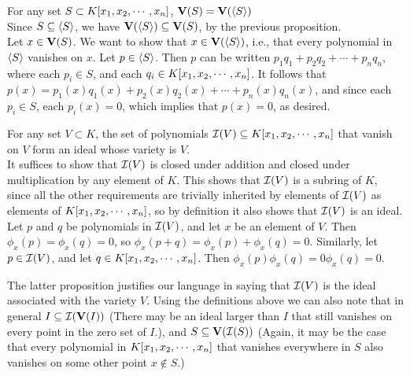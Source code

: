 \documentclass[twoside]{report}
\begin{document}
\begin{proposition} For any set $S \subset K[x_1, x_2,\cdots,x_n]$, $\mathbf{V}(S) = \mathbf{V}(\langle S\rangle)$\\

  Since $S \subseteq \langle S\rangle$, we have $\mathbf{V}(\langle S\rangle)
  \subseteq \mathbf{V}(S)$, by the previous proposition.\\

  Let $x \in \mathbf{V}(S)$. We want to show that $x \in
  \mathbf{V}(\langle S\rangle)$, i.e., that every polynomial in $\langle S\rangle$
  vanishes on $x$.  Let $p \in \langle S\rangle$.  Then $p$ can be written
  $p_1q_1 + p_2q_2 + \cdots + p_nq_n$, where each $p_i \in S$, and
  each $q_i \in K[x_1, x_2,\cdots,x_n]$.  It follows that $p(x) = p_1(x)q_1(x) +
  p_2(x)q_2(x) + \cdots + p_n(x)q_n(x)$, and since each $p_i \in S$,
  each $p_i(x) = 0$, which implies that $p(x) = 0$, as desired.

\end{proposition}

\begin{proposition} For any set $V \subset K$, the set of polynomials
  $\mathcal{I}(V) \subseteq K[x_1, x_2,\cdots,x_n]$ that vanish on $V$ form an ideal
  whose variety is $V$.\\

  It suffices to show that $\mathcal{I}(V)$ is closed under addition and
  closed under multiplication by any element of $K$.  This shows that
  $\mathcal{I}(V)$ is a subring of $K$, since all the other requirements
  are trivially inherited by elements of $\mathcal{I}(V)$ as elements of
  $K[x_1, x_2,\cdots,x_n]$, so by definition it also shows that $\mathcal{I}(V)$ is
  an ideal.\\

  Let $p$ and $q$ be polynomials in $\mathcal{I}(V)$, and let $x$ be an
  element of $V$. Then $\phi_x(p) = \phi_x(q) = 0$, so $\phi_x(p + q)
  = \phi_x(p) + \phi_x(q) = 0$.  Similarly, let $p \in \mathcal{I}(V)$,
  and let $q \in K[x_1, x_2,\cdots,x_n]$.  Then $\phi_x(p)\phi_x(q) = 0\phi_x(q) =
  0$.
\end{proposition}

The latter proposition justifies our language in saying that
$\mathcal{I}(V)$ is the ideal associated with the variety $V$.  Using
the definitions above we can also note that in general $I \subseteq
\mathcal{I}(\mathbf{V}(I))$ (There may be an ideal larger than $I$ that
still vanishes on every point in the zero set of $I$.), and $S
\subseteq \mathbf{V}(\mathcal{I}(S))$ (Again, it may be the case that
every polynomial in $K[x_1, x_2,\cdots,x_n]$ that vanishes everywhere in $S$ also
vanishes on some other point $x \notin S$.)
\end{document}
